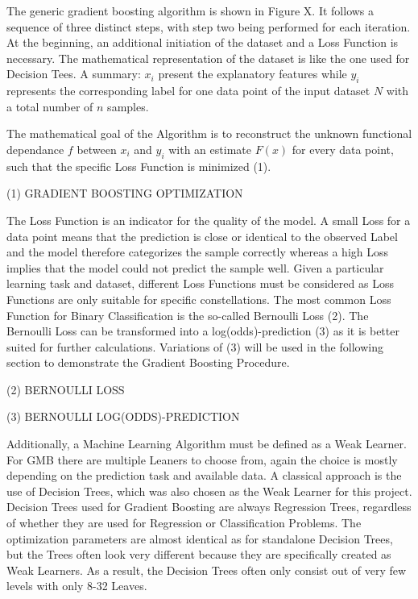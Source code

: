 The generic gradient boosting algorithm is shown in Figure X. It follows a sequence of three 
distinct steps, with step two being performed for each iteration. At the beginning, an 
additional initiation of the dataset and a Loss Function is necessary. The mathematical 
representation of the dataset is like the one used for Decision Tees. A summary: \(x_{i}\) present the 
explanatory features while \(y_{i}\) represents the corresponding label for one data point of the input 
dataset \(N\) with a total number of \(n\) samples. 

The mathematical goal of the Algorithm is to reconstruct the unknown functional dependance \(f\) 
between \(x_{i}\) and \(y_{i}\) with an estimate \(F(x)\) for every data point, such that the specific Loss 
Function is minimized (1). 

(1) GRADIENT BOOSTING OPTIMIZATION 

The Loss Function is an indicator for the quality of the model. A small Loss for a data point 
means that the prediction is close or identical to the observed Label and the model therefore 
categorizes the sample correctly whereas a high Loss implies that the model could not predict 
the sample well. Given a particular learning task and dataset, different Loss Functions must 
be considered as Loss Functions are only suitable for specific constellations. The most common 
Loss Function for Binary Classification is the so-called Bernoulli Loss (2). The Bernoulli Loss 
can be transformed into a log(odds)-prediction (3) as it is better suited for further calculations. 
Variations of (3) will be used in the following section to demonstrate the Gradient Boosting 
Procedure. 

(2) BERNOULLI LOSS 

(3) BERNOULLI LOG(ODDS)-PREDICTION 

Additionally, a Machine Learning Algorithm must be defined as a Weak Learner. For GMB there 
are multiple Leaners to choose from, again the choice is mostly depending on the prediction 
task and available data. A classical approach is the use of Decision Trees, which was also 
chosen as the Weak Learner for this project. Decision Trees used for Gradient Boosting are 
always Regression Trees, regardless of whether they are used for Regression or Classification 
Problems. The optimization parameters are almost identical as for standalone Decision Trees, 
but the Trees often look very different because they are specifically created as Weak Learners. 
As a result, the Decision Trees often only consist out of very few levels with only 8-32 Leaves.

